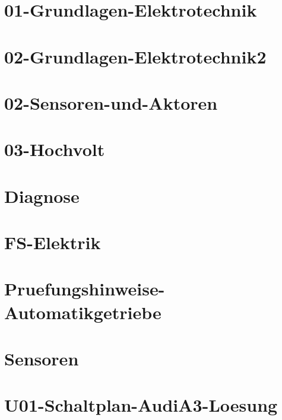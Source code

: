 



\chapter{01-Grundlagen-Elektrotechnik}
%
\chapter{02-Grundlagen-Elektrotechnik2}
%
\chapter{02-Sensoren-und-Aktoren}
%
\chapter{03-Hochvolt}
%
\chapter{Diagnose}
%
\chapter{FS-Elektrik}
%
\chapter{Pruefungshinweise-Automatikgetriebe}
%
\chapter{Sensoren}
%
\chapter{U01-Schaltplan-AudiA3-Loesung}
%
